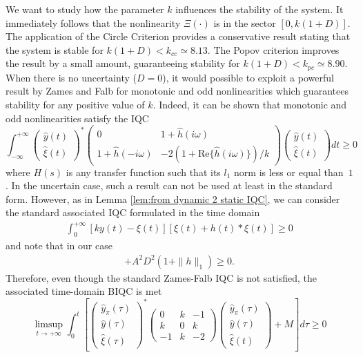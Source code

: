 \documentclass[letterpaper,10pt,conference,twocolumn]{IEEEtran}
\newcommand{\csi}{\xi}
\newcommand{\w}{\omega}
\begin{document}
We want to study how the parameter $k$ influences the stability of the system.
It immediately follows that the nonlinearity $\Xi(\cdot)$ is in the sector $[0, k(1+D)]$. The application of the Circle Criterion provides a conservative result stating that the system is stable for $k(1+D)< k_{cc}\simeq 8.13$.
The Popov criterion improves the result by a small amount, guaranteeing stability for $k(1+D)< k_{pc}\simeq 8.90$.
When there is no uncertainty ($D=0$), it would possible to exploit a powerful result by Zames and Falb for monotonic and odd nonlinearities which guarantees stability for any positive value of $k$. Indeed, it can be shown that monotonic and odd nonlinearities satisfy the IQC
\begin{equation*}
	\int_{-\infty}^{+\infty}
		\left(\begin{array}{c}
			\hat y(t) \\
			\hat \csi(t)
		\end{array}\right)^*
		\left(\begin{array}{cc}
			0 		& 1+\hat h(i\w)\\
			1+\hat h(-i\w)	& -2(1+ \text{Re}\{\hat h(i\w)\})/k
		\end{array}\right)
		\left(\begin{array}{c}
			\hat y(t) \\
			\hat \csi(t)
		\end{array}\right)
	dt \geq 0
\end{equation*}
where $H(s)$ is any transfer function such that its $l_1$ norm is less or equal than~$1$.
In the uncertain case, such a result can not be used at least in the standard form.
However, as in Lemma \ref{lem:from dynamic 2 static IQC}, we can consider the standard associated IQC formulated in the time domain
\begin{align*}
	\int_{0}^{+\infty}[ky(t)-\csi(t)][\csi(t)+h(t)*\csi(t)]\geq 0
\end{align*}
and note that in our case
\begin{align*}
	[ky(t)-\csi(t)][\csi(t)+h(t)*\csi(t)] +A^2D^2(1+\|h\|_1) \geq 0.
\end{align*}
Therefore, even though the standard Zames-Falb IQC is not satisfied, the associated time-domain BIQC is met
\begin{equation*}
	\limsup_{t\rightarrow +\infty}
	\int_{0}^{t}
		\left[
		\left(\begin{array}{c}
			\hat y_\pi(\tau) \\
			\hat y(\tau) \\
			\hat \csi(\tau)
		\end{array}\right)^*
		\left(\begin{array}{ccc}
			0	& k	& -1\\
			k	& 0	& k \\
			-1	& k	& -2
		\end{array}\right)
		\left(\begin{array}{c}
			\hat y_\pi(\tau) \\
			\hat y(\tau) \\
			\hat \csi(t)
		\end{array}\right)
		+ M
		\right]
	d\tau \geq 0
\end{equation*}
\end{document}
